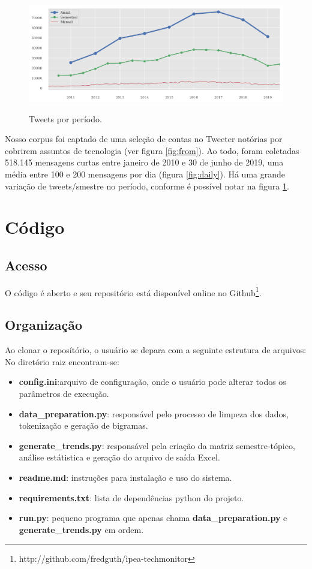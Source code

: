 \documentclass[paper=a4, fontsize=11pt]{scrartcl}
\numberwithin{equation}{section}		%
\numberwithin{figure}{section}			%
\numberwithin{table}{section}				%
\begin{document}
\begin{figure}[!h]
	\centering
	\caption{Tweets por período.}
	\includegraphics[width=.8\columnwidth]{anual-semestral}
	\label{fig:volume-tweets}
\end{figure}
Nosso corpus foi captado de uma seleção de contas no Tweeter notórias por cobrirem assuntos de tecnologia (ver figura \ref{fig:from}). Ao todo, foram coletadas 518.145 mensagens curtas entre janeiro de 2010 e 30 de junho de 2019, uma média entre 100 e 200 mensagens por dia (figura \ref{fig:daily}).
Há uma grande variação de tweets/smestre no período, conforme é possível notar na figura \ref{fig:volume-tweets}.
\section{Código}
\subsection{Acesso}
O código é aberto e seu repositório está disponível online no Github\footnote{http://github.com/fredguth/ipea-techmonitor}.
\subsection{Organização}
Ao clonar o reposítório, o usuário se depara com a seguinte estrutura de arquivos:
\vspace{.7cm}
No diretório raiz encontram-se:
\begin{itemize}
	\item \textbf{config.ini}:arquivo de configuração, onde o usuário pode alterar todos os parâmetros de execução.
	\item \textbf{data\_preparation.py}: responsável pelo processo de limpeza dos dados, tokenização e geração de bigramas.
	\item \textbf{generate\_trends.py}: responsável pela criação da matriz semestre-tópico, análise estátistica e geração do arquivo de saída Excel.
	\item \textbf{readme.md}: instruções para instalação e uso do sistema.
	\item \textbf{requirements.txt}: lista de dependências python do projeto. 
	\item \textbf{run.py}: pequeno programa que apenas chama \textbf{data\_preparation.py} e \textbf{generate\_trends.py} em ordem.
\end{itemize}	
\end{document}
